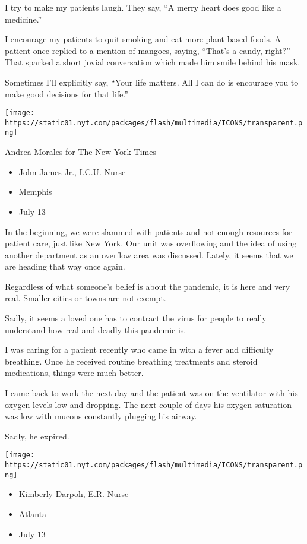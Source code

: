 I try to make my patients laugh. They say, ``A merry heart does good
like a medicine.''

I encourage my patients to quit smoking and eat more plant-based foods.
A patient once replied to a mention of mangoes, saying, ``That's a
candy, right?'' That sparked a short jovial conversation which made him
smile behind his mask.

Sometimes I'll explicitly say, ``Your life matters. All I can do is
encourage you to make good decisions for that life.''

\texttt{[image: https://static01.nyt.com/packages/flash/multimedia/ICONS/transparent.png]}

Andrea Morales for The New York Times

\begin{itemize}
\tightlist
\item
  John James Jr., I.C.U. Nurse
\item
  Memphis
\item
  July 13
\end{itemize}

In the beginning, we were slammed with patients and not enough resources
for patient care, just like New York. Our unit was overflowing and the
idea of using another department as an overflow area was discussed.
Lately, it seems that we are heading that way once again.

Regardless of what someone's belief is about the pandemic, it is here
and very real. Smaller cities or towns are not exempt.

Sadly, it seems a loved one has to contract the virus for people to
really understand how real and deadly this pandemic is.

I was caring for a patient recently who came in with a fever and
difficulty breathing. Once he received routine breathing treatments and
steroid medications, things were much better.

I came back to work the next day and the patient was on the ventilator
with his oxygen levels low and dropping. The next couple of days his
oxygen saturation was low with mucous constantly plugging his airway.

Sadly, he expired.

\texttt{[image: https://static01.nyt.com/packages/flash/multimedia/ICONS/transparent.png]}

\begin{itemize}
\tightlist
\item
  Kimberly Darpoh, E.R. Nurse
\item
  Atlanta
\item
  July 13
\end{itemize}

